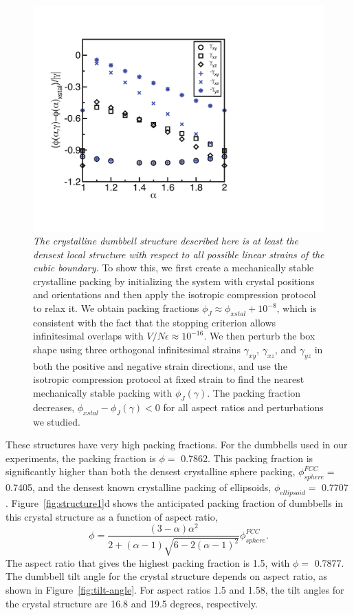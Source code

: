 \begin{figure}[htbp]
\centering
\includegraphics[width=1.0\textwidth]{figures/CsuppFigure7.pdf}
\caption{\label{fig:mechanical-stability} \emph{The crystalline dumbbell structure described here is at least the densest local structure with respect to all possible linear strains of the cubic boundary.}
	To show this, we first create a mechanically stable crystalline packing by initializing the system with crystal positions and orientations and then apply the isotropic compression protocol to relax it. We obtain packing fractions $\phi_J \approx \phi_{xstal} + 10^{-8}$, which is consistent with the fact that the stopping criterion allows infinitesimal overlaps with $V/N\epsilon\approx 10^{-16}$. We then perturb the box shape using three orthogonal infinitesimal strains $\gamma_{xy}$, $\gamma_{xz}$, and $\gamma_{yz}$ in both the positive and negative strain directions, and use the isotropic compression protocol at fixed strain to find the nearest mechanically stable packing with $\phi_J(\gamma)$. The packing fraction decreases, $\phi_{xstal}-\phi_J(\gamma)<0$ for all aspect ratios and perturbations we studied.}
\end{figure}

 These structures have very high packing fractions.
 For the dumbbells used in our experiments, the  packing fraction is $\phi=$ 0.7862.
 This packing fraction is significantly higher than both the densest crystalline sphere packing, $\phi^{FCC}_{sphere}=$ 0.7405, and the densest known crystalline packing of ellipsoids, $\phi_{ellipsoid}=$ 0.7707 \cite{Donev2004}.
  Figure~\ref{fig:structure1}d shows the anticipated packing fraction of dumbbells in this crystal structure as a function of aspect ratio, 
\begin{equation}\label{eqn:phi-vs-aspect}
\phi = \frac{(3-\alpha)\alpha^2}{2+(\alpha-1)\sqrt{6-2(\alpha-1)^2}}\phi^{FCC}_{sphere}.
\end{equation}
 The aspect ratio that gives the highest packing fraction is 1.5, with $\phi=$ 0.7877.
 The dumbbell tilt angle for the crystal structure depends on aspect ratio, as shown in Figure~\ref{fig:tilt-angle}.
 For aspect ratios 1.5 and 1.58, the tilt angles for the crystal structure are 16.8 and 19.5 degrees, respectively.

